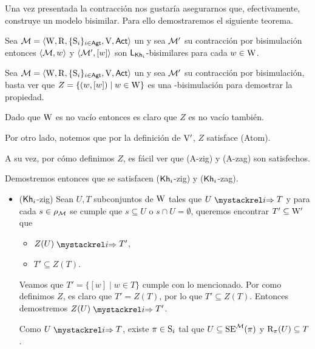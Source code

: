 Una vez presentada la contracción nos gustaría asegurarnos que, efectivamente, construye un modelo bisimilar. Para ello demostraremos el 
siguiente teorema.

\begin{teorema}
    Sea $\model=\tup{\W,\R,\cset{\S_i}_{i \in \AGT},\V,\ACT}$ un \ults y sea $\modults'$ su contracción por bisimulación entonces 
    $\tup{\modults,w}$ y $\tup{\modults',[w]}$ son $\KHilogic$-bisimilares para cada $w \in \W$.
\end{teorema}

\begin{demostracion}
    Sea $\model=\tup{\W,\R,\cset{\S_i}_{i \in \AGT},\V,\ACT}$ un \ults
    y sea $\modults'$ su contracción por bisimulación, basta ver que $Z = \{(w,[w]) \mid w \in\W\}$ es una \KHilogic-bisimulación 
    para demostrar la propiedad.

    Dado que $\W$ es no vacío entonces es claro que $Z$ es no vacío también.

    Por otro lado, notemos que por la definición de $\V'$, $Z$ satisface (Atom).

    A su vez, por cómo definimos $Z$, es fácil ver que (A-zig) y (A-zag) son satisfechos.
    
    Demostremos entonces que se satisfacen ($\khi$-zig) y ($\khi$-zag).

    \begin{itemize}
        \item ($\khi$-zig) Sean $U, T$ subconjuntos de $\W$ tales que $U \ultsExecAgi T$ y para cada $s \in \rho_\modults$ se cumple que 
        $s \subseteq U$ o $s \cap U = \emptyset$, queremos encontrar $T' \subseteq \W'$ que

        \begin{multicols}{2}
            \begin{itemize}
                \item $Z(U) \ultsExecAgi T'$, 
                \item $T' \subseteq Z(T)$.
            \end{itemize}
        \end{multicols}

        Veamos que $T' = \{ [w] \mid w \in T\}$ cumple con lo mencionado. Por como definimos $Z$, es claro que $T'  = Z(T)$, por lo que 
        $T' \subseteq Z(T)$. Entonces demostremos $Z(U) \ultsExecAgi T'$.

        Como $U \ultsExecAgi T$, existe $\pi \in \S_i$ tal que $U \subseteq \sexec^{\model}(\pi)$ y 
        $\R_\pi(U) \subseteq T$. 


\end{itemize}
\end{demostracion}
